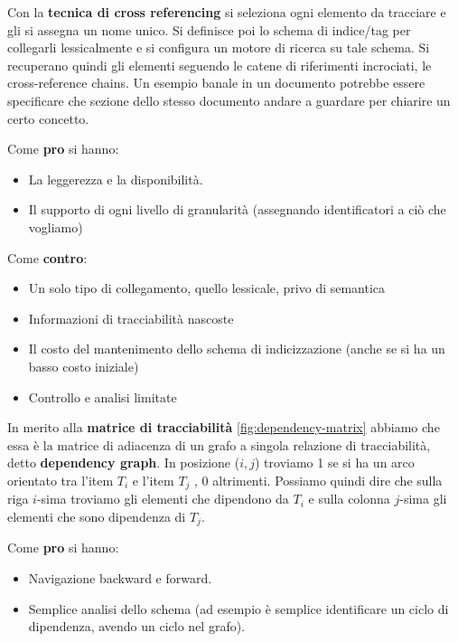 Con la \textbf{tecnica di cross referencing} si seleziona ogni elemento da tracciare e
gli si assegna un nome unico. Si definisce poi lo schema di indice/tag per
collegarli lessicalmente e si configura un motore di ricerca su tale schema.
Si recuperano quindi gli elementi seguendo le catene di riferimenti incrociati,
le cross-reference chains. Un esempio banale in un documento potrebbe essere
specificare che sezione dello stesso documento andare a guardare per chiarire un
certo concetto.

Come \textbf{pro} si hanno:
\begin{itemize}
      \item La leggerezza e la disponibilità.
      \item Il supporto di ogni livello di granularità (assegnando identificatori
            a ciò che vogliamo)
\end{itemize}
Come \textbf{contro}:
\begin{itemize}
      \item Un solo tipo di collegamento, quello lessicale, privo di semantica
      \item Informazioni di tracciabilità nascoste
      \item Il costo del mantenimento dello schema di indicizzazione (anche se si ha
            un basso costo iniziale)
      \item Controllo e analisi limitate
\end{itemize}
In merito alla \textbf{matrice di tracciabilità} \ref{fig:dependency-matrix}
abbiamo che essa è la matrice di adiacenza di un grafo a singola relazione di
tracciabilità, detto \textbf{dependency graph}. In posizione ($i,j$) troviamo 1
se si ha un arco orientato tra l'item $T_i$ e l'item $T_j$ , 0 altrimenti.
Possiamo quindi dire che sulla riga $i$-sima troviamo gli elementi che dipendono
da $T_i$ e sulla colonna $j$-sima gli elementi che sono dipendenza di $T_j$.

Come \textbf{pro} si hanno:
\begin{itemize}
      \item Navigazione backward e forward.
      \item Semplice analisi dello schema (ad esempio è semplice identificare un
            ciclo di dipendenza, avendo un ciclo nel grafo).
\end{itemize}

